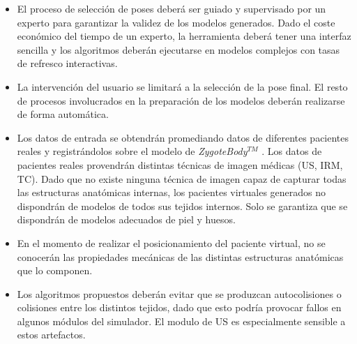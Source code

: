 \begin{itemize}
    \item El proceso de selección de poses deberá ser guiado y supervisado por un experto para garantizar la validez de los modelos generados. Dado el coste económico del tiempo de un experto, la herramienta deberá tener una interfaz sencilla y los algoritmos deberán ejecutarse en modelos complejos con tasas de refresco interactivas.
    \item La intervención del usuario se limitará a la selección de la pose final. El resto de procesos involucrados en la preparación de los modelos deberán realizarse de forma automática.
    \item Los datos de entrada se obtendrán promediando datos de diferentes pacientes reales y registrándolos sobre el modelo de \emph{ZygoteBody}$^{TM}$ \cite{kelc2012zygote}. Los datos de pacientes reales provendrán distintas técnicas de imagen médicas (\ac{US}, \ac{IRM}, \ac{TC}). Dado que no existe ninguna técnica de imagen capaz de capturar todas las estructuras anatómicas internas, los pacientes virtuales generados no dispondrán de modelos de todos sus tejidos internos. Solo se garantiza que se dispondrán de modelos adecuados de piel y huesos. 
    \item En el momento de realizar el posicionamiento del paciente virtual, no se conocerán las propiedades mecánicas de las distintas estructuras anatómicas que lo componen.
    \item Los algoritmos propuestos deberán evitar que se produzcan autocolisiones o colisiones entre los distintos tejidos, dado que esto podría provocar fallos en  algunos módulos del simulador. El modulo de \ac{US} es especialmente sensible a estos artefactos.

\end{itemize}
